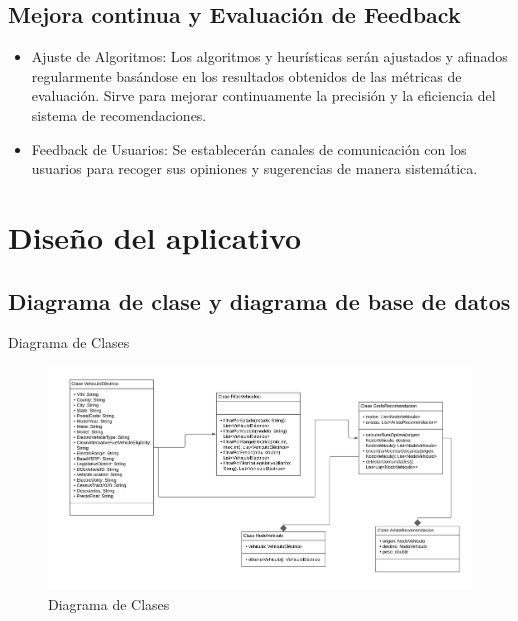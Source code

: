 \documentclass[12pt]{article}
\begin{document}
\subsection{Mejora continua y Evaluación de Feedback}
\begin{itemize}
    \item Ajuste de Algoritmos: Los algoritmos y heurísticas serán ajustados y afinados regularmente basándose en los resultados obtenidos de las métricas de evaluación. Sirve para mejorar continuamente la precisión y la eficiencia del sistema de recomendaciones.
    \item Feedback de Usuarios: Se establecerán canales de comunicación con los usuarios para recoger sus opiniones y sugerencias de manera sistemática.
\end{itemize}




\section{Diseño del aplicativo}
\subsection{Diagrama de clase y diagrama de base de datos}

Diagrama de Clases
\begin{figure}[htbp]
    \centering
    \includegraphics[width=\textwidth]{./imgs-latex/diagramadeclases.png}
    \caption{Diagrama de Clases}\label{fig:diagramadeclases}
\end{figure}
\end{document}
